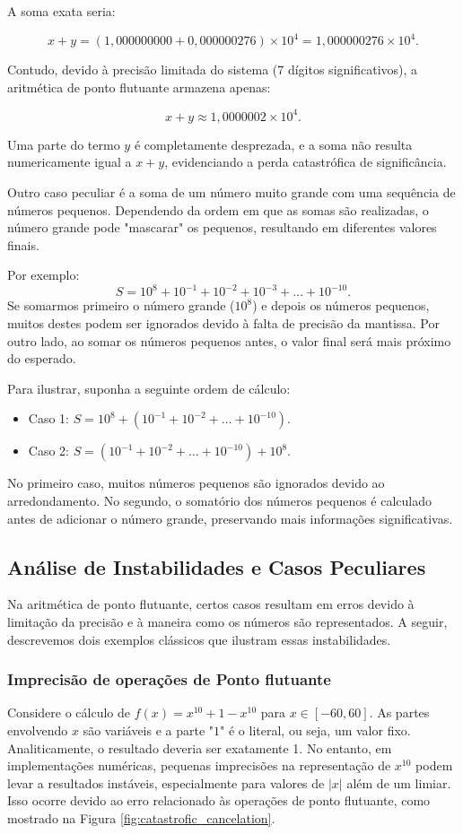 A soma exata seria:

\[
x + y = (1{,}000000000 + 0{,}000000276) \times 10^4 = 1{,}000000276 \times 10^4.
\]

Contudo, devido à precisão limitada do sistema (7 dígitos significativos), a aritmética de ponto flutuante armazena apenas:

\[
x + y \approx 1{,}0000002 \times 10^4.
\]

Uma parte do termo \( y \) é completamente desprezada, e a soma não resulta numericamente igual a \( x + y\), evidenciando a perda catastrófica de significância.

Outro caso peculiar é a soma de um número muito grande com uma sequência de números pequenos. Dependendo da ordem em que as somas são realizadas, o número grande pode "mascarar" os pequenos, resultando em diferentes valores finais.

Por exemplo:
\[
S = 10^{8} + 10^{-1} + 10^{-2} + 10^{-3} + \ldots + 10^{-10}.
\]
Se somarmos primeiro o número grande (\(10^8\)) e depois os números pequenos, muitos destes podem ser ignorados devido à falta de precisão da mantissa. Por outro lado, ao somar os números pequenos antes, o valor final será mais próximo do esperado.

Para ilustrar, suponha a seguinte ordem de cálculo:
\begin{itemize}
    \item Caso 1: \(S = 10^{8} + (10^{-1} + 10^{-2} + \ldots + 10^{-10})\).
    \item Caso 2: \(S = (10^{-1} + 10^{-2} + \ldots + 10^{-10}) + 10^{8}\).
\end{itemize}
No primeiro caso, muitos números pequenos são ignorados devido ao arredondamento. No segundo, o somatório dos números pequenos é calculado antes de adicionar o número grande, preservando mais informações significativas.

\subsection{Análise de Instabilidades e Casos Peculiares}

Na aritmética de ponto flutuante, certos casos resultam em erros devido à limitação da precisão e à maneira como os números são representados. A seguir, descrevemos dois exemplos clássicos que ilustram essas instabilidades.

\subsubsection{Imprecisão de operações de Ponto flutuante}
Considere o cálculo de $f(x) = x^{10} + 1 - x^{10}$ para \(x \in [-60, 60]\). As partes envolvendo $x$ são variáveis e a parte "$1$" é o literal, ou seja, um valor fixo. Analiticamente, o resultado deveria ser exatamente 1. No entanto, em implementações numéricas, pequenas imprecisões na representação de \(x^{10}\) podem levar a resultados instáveis, especialmente para valores de \(|x|\) além de um limiar. Isso ocorre devido ao erro relacionado às operações de ponto flutuante, como mostrado na Figura \ref{fig:catastrofic_cancelation}. 

